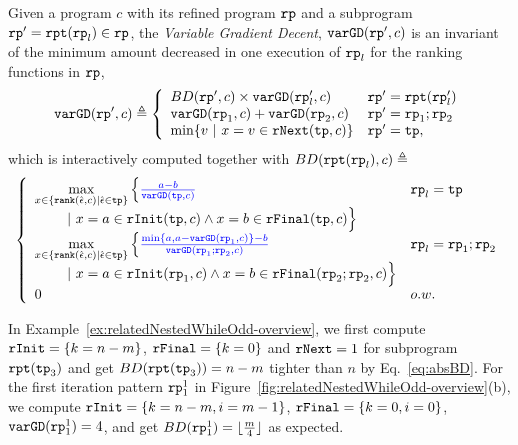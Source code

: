 \begin{defn}
\label{def:loopbound}
Given a program $c$ with its refined program $\mathtt{rp}$ and a subprogram $\mathtt{rp}' = \mathtt{rpt}(\mathtt{rp}_l) \in \mathtt{rp}$,
the \emph{Variable Gradient Decent}, 
 $\mathtt{varGD}(\mathtt{rp}', c)$ is an invariant of the minimum amount decreased in one execution of $\mathtt{rp}_l$ for the ranking functions in $\mathtt{rp}$,
{\small
\[
 \varGD(\rprog', c) \triangleq
 \left\{
 \begin{array}{ll}
 BD(\rprog', c) \times {\varGD(\rprog_l', c)} & \rprog' = \rprepeat(\rprog_l') \\
 \varGD(\rprog_1, c) + \varGD(\rprog_2, c) & \rprog' = \rprog_1;\rprog_2 \\
 \min\left\{v ~|~ x = v \in \rfnext(\tpath, c) \right\} & \rprog' = \tpath, 
 \end{array}
 \right.
 \]
 which is interactively computed together with $BD(\mathtt{rpt}(\mathtt{rp}_l), c) \triangleq$
 \[
 \left\{ 
 \begin{array}{ll}
 \max\limits_{x \in \left\{ \locbound(\absevent, c) | \absevent \in \tpath \right\}} 
 \Big\{ \highlight{\frac{a - b}{\varGD(\tpath, c)}} & \rprog_l = \tpath
 \\ \qquad 
 ~\vert~
 x = a \in \rfinit(\tpath, c)
 \land x = b \in \rffinal(\tpath, c)
 \Big\} 
 \\
 \max\limits_{x \in \left\{ \locbound(\absevent, c) | \absevent \in \tpath \right\}} 
 \Big\{ \highlight{\frac{\min\{ a, a - \varGD(\rprog_1, c) \} - b}{\varGD(\rprog_1;\rprog_2, c)}} 
 & \rprog_l = \rprog_1;\rprog_2
 \\ \qquad 
 ~\vert~
 x = a \in \rfinit(\rprog_1, c)
 \land x = b \in \rffinal(\rprog_2;\rprog_2, c)
 \Big\} \\
 0 & o.w.
 \end{array} 
 \right.
\]
}
\end{defn}
In Example~\ref{ex:relatedNestedWhileOdd-overview}, we first compute $\mathtt{rInit} = \{k = n - m\}$, $\mathtt{rFinal} = \{k = 0\}$ and $\mathtt{rNext} = 1$ for subprogram $\mathtt{rpt}(\mathtt{tp}_3)$ and get $BD(\mathtt{rpt}(\mathtt{tp}_3)) = n - m$ tighter than $n$ by Eq.~\ref{eq:absBD}.
For the first iteration pattern $\mathtt{rp}_1^1$ in Figure~\ref{fig:relatedNestedWhileOdd-overview}(b), we compute 
$\mathtt{rInit} = \{k = n - m, i = m - 1\}$, $\mathtt{rFinal} = \{k = 0, i = 0\}$, $\mathtt{varGD}(\mathtt{rp}_1^1) = 4$, and get $BD(\mathtt{rp}_1^1) = \lfloor \frac{m}{4} \rfloor $ as expected.

